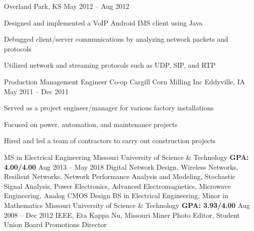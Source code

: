 \documentclass[]{awesome-cv}
\begin{document}
\begin{cventries}
	{Overland Park, KS}
	{May 2012 – Aug 2012}
	{\begin{cvitems}
		\item {Designed and implemented a VoIP Android IMS client using Java}
		\item {Debugged client/server communications by analyzing network packets and protocols}
		\item {Utilized network and streaming protocols such as UDP, SIP, and RTP}
		\end{cvitems}}
	\cventry
	{Production Management Engineer Co-op}
	{Cargill Corn Milling Inc}
	{Eddyville, IA}
	{May 2011 – Dec 2011}
	{\begin{cvitems}
		\item {Served as a project engineer/manager for various factory installations}
		\item {Focused on power, automation, and maintenance projects}
		\item {Hired and led a team of contractors to carry out construction projects}
		\end{cvitems}}
\end{cventries}

\newpage 
\vspace*{0mm}

\begin{cventries}
	\cventry
	{MS in Electrical Engineering}
	{Missouri University of Science \& Technology}
	{\bfseries GPA: 4.00/4.00}
	{Aug 2013 – May 2018}
	{Digital Network Design, Wireless Networks, Resilient Networks, Network Performance Analysis and Modeling, \newline Stochastic Signal Analysis, Power Electronics, Advanced Electromagnetics, Microwave Engineering, Analog CMOS Design}
	\cventry
	{BS in Electrical Engineering, Minor in Mathematics}
	{Missouri University of Science \& Technology}
	{\bfseries GPA: 3.93/4.00}
	{Aug 2008 – Dec 2012}
	{IEEE, Eta Kappa Nu, Missouri Miner Photo Editor, Student Union Board Promotions Director} %
\end{cventries}

\vspace*{0mm}
\end{document}
